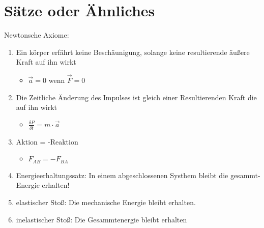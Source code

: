 \documentclass[a4paper,12pt]{scrartcl}
\begin{document}
\section{Sätze oder Ähnliches}
Newtonsche Axiome:
\begin{enumerate}
\item Ein körper erfährt keine Beschäunigung, solange keine resultierende äußere Kraft auf ihn wirkt
\begin{itemize}
\item $\overrightarrow{a} = 0$ wenn $\overrightarrow{F} = 0$
\end{itemize}
\item Die Zeitliche Änderung des Impulses ist gleich einer Resultierenden  Kraft die auf ihn wirkt
\begin{itemize}
\item $\frac{\delta P}{\delta t} = m \cdot \overrightarrow{a}$
\end{itemize}
\item Aktion = -Reaktion
\begin{itemize}
\item $F_{AB} = -F_{BA}$
\end{itemize}
\item Energieerhaltungssatz: In einem abgeschlossenen Systhem bleibt die gesammt-Energie erhalten!
\item elastischer Stoß: Die mechanische Energie bleibt erhalten.
\item inelastischer Stoß: Die Gesammtenergie bleibt erhalten
\end{enumerate}
\end{document}
